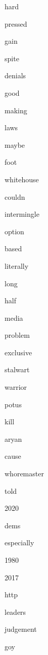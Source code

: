 \documentclass[varwidth]{standalone}
\begin{document}
\begin{CJK*}{UTF8}{gbsn}
{{{\colorbox{red!6.928152084350586}{\strut hard}
\colorbox{red!5.509166717529297}{\strut pressed}
\colorbox{red!4.440706253051758}{\strut gain}
\colorbox{red!4.852123260498047}{\strut spite}
\colorbox{red!12.297887802124023}{\strut denials}
\colorbox{red!11.902057647705078}{\strut good}
\colorbox{red!13.297505378723145}{\strut making}
\colorbox{red!5.415767669677734}{\strut laws}
\colorbox{red!5.830621719360352}{\strut maybe}
\colorbox{red!4.183380603790283}{\strut foot}
\colorbox{red!9.801210403442383}{\strut whitehouse}
\colorbox{red!4.548172950744629}{\strut couldn}
\colorbox{red!11.194100379943848}{\strut intermingle}
\colorbox{red!7.27750825881958}{\strut option}
\colorbox{red!8.009592056274414}{\strut based}
\colorbox{red!4.359834671020508}{\strut literally}
\colorbox{red!5.460508346557617}{\strut long}
\colorbox{red!7.0879902839660645}{\strut half}
\colorbox{red!6.493686676025391}{\strut media}
\colorbox{red!6.849637031555176}{\strut problem}
\colorbox{red!4.04258918762207}{\strut exclusive}
\colorbox{red!4.102118015289307}{\strut stalwart}
\colorbox{red!4.4453582763671875}{\strut warrior}
\colorbox{red!7.560798645019531}{\strut potus}
\colorbox{red!10.493305206298828}{\strut kill}
\colorbox{red!8.367289543151855}{\strut aryan}
\colorbox{red!9.50257396697998}{\strut cause}
\colorbox{red!4.056933403015137}{\strut whoremaster}
\colorbox{red!4.4554948806762695}{\strut told}
\colorbox{red!5.2165327072143555}{\strut 2020}
\colorbox{red!11.774904251098633}{\strut dems}
\colorbox{red!4.579812049865723}{\strut especially}
\colorbox{red!1.8365459442138672}{\strut 1980}
\colorbox{red!5.596283912658691}{\strut 2017}
\colorbox{red!2.8816423416137695}{\strut http}
\colorbox{red!2.9781675338745117}{\strut leaders}
\colorbox{red!4.6957244873046875}{\strut judgement}
\colorbox{red!11.99644660949707}{\strut goy}

}}}
\end{CJK*}
\end{document}
